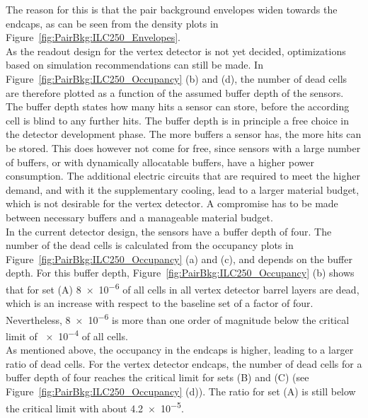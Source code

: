 The reason for this is that the pair background envelopes widen towards the endcaps, as can be seen from the density plots in Figure~\ref{fig:PairBkg:ILC250_Envelopes}.
\\As the readout design for the vertex detector is not yet decided, optimizations based on simulation recommendations can still be made.
In Figure~\ref{fig:PairBkg:ILC250_Occupancy} (b) and (d), the number of dead cells are therefore plotted as a function of the assumed buffer depth of the sensors.
The buffer depth states how many hits a sensor can store, before the according cell is blind to any further hits.
The buffer depth is in principle a free choice in the detector development phase.
The more buffers a sensor has, the more hits can be stored.
This does however not come for free, since sensors with a large number of buffers, or with dynamically allocatable buffers, have a higher power consumption.
The additional electric circuits that are required to meet the higher demand, and with it the supplementary cooling, lead to a larger material budget, which is not desirable for the vertex detector.
A compromise has to be made between necessary buffers and a manageable material budget.  
\\In the current detector design, the sensors have a buffer depth of four. 
The number of the dead cells is calculated from the occupancy plots in Figure~\ref{fig:PairBkg:ILC250_Occupancy} (a) and (c), and depends on the buffer depth.
For this buffer depth, Figure~\ref{fig:PairBkg:ILC250_Occupancy} (b) shows that for set (A) \num{8e-6} of all cells in all vertex detector barrel layers are dead, which is an increase with respect to the baseline set of a factor of four.
Nevertheless, \num{8e-6} is more than one order of magnitude below the critical limit of \num{e-4} of all cells.
\\As mentioned above, the occupancy in the endcaps is higher, leading to a larger ratio of dead cells.
For the vertex detector endcaps, the number of dead cells for a buffer depth of four reaches the critical limit for sets (B) and (C) (see Figure~\ref{fig:PairBkg:ILC250_Occupancy} (d)).
The ratio for set (A) is still below the critical limit with about \num{4.2e-5}.\\
